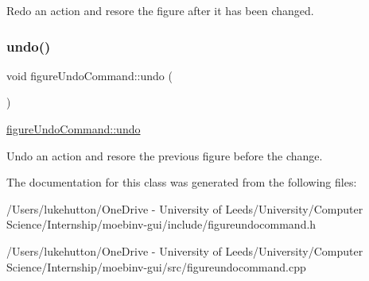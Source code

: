Redo an action and resore the figure after it has been changed. \mbox{\label{classfigure_undo_command_a9e733f81f847b07673f141bf13c5aace}} 
\subsubsection{\texorpdfstring{undo()}{undo()}}
{\footnotesize\ttfamily void figure\+Undo\+Command\+::undo (\begin{DoxyParamCaption}{ }\end{DoxyParamCaption})}



\mbox{\hyperlink{classfigure_undo_command_a9e733f81f847b07673f141bf13c5aace}{figure\+Undo\+Command\+::undo}} 

Undo an action and resore the previous figure before the change. 

The documentation for this class was generated from the following files\+:\begin{DoxyCompactItemize}
\item 
/\+Users/lukehutton/\+One\+Drive -\/ University of Leeds/\+University/\+Computer Science/\+Internship/moebinv-\/gui/include/figureundocommand.\+h\item 
/\+Users/lukehutton/\+One\+Drive -\/ University of Leeds/\+University/\+Computer Science/\+Internship/moebinv-\/gui/src/figureundocommand.\+cpp\end{DoxyCompactItemize}
